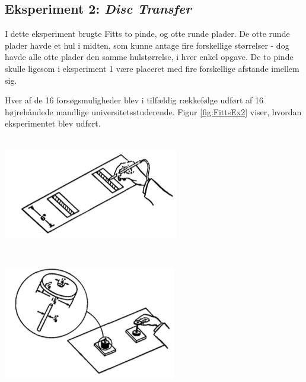 \subsection*{Eksperiment 2: \textit{Disc Transfer}}
I dette eksperiment brugte Fitts to pinde, og otte runde plader. De otte runde plader havde et hul i midten, som kunne antage fire forskellige størrelser - dog havde alle otte plader den samme hulstørrelse, i hver enkel opgave. De to pinde skulle ligesom i eksperiment 1 være placeret med fire forskellige afstande imellem sig. 

Hver af de 16 forsøgsmuligheder blev i tilfældig rækkefølge udført af 16 højrehåndede mandlige universitetsstuderende. Figur \ref{fig:FittsEx2} viser, hvordan eksperimentet blev udført.\\\\
\begin{minipage}[c]{\linewidth}
	\begin{minipage}[b]{.45\linewidth}
		\includegraphics[width=\textwidth]{images/illustrations/fitt_ex1}
		\label{fig:FittsEx1}
	\end{minipage}
	\begin{minipage}[b]{.1\linewidth}
		~
	\end{minipage}
	\begin{minipage}[b]{.45\linewidth}
		\includegraphics[width=\textwidth]{images/illustrations/fitt_ex2}
		\label{fig:FittsEx2}
	\end{minipage}
\end{minipage}

